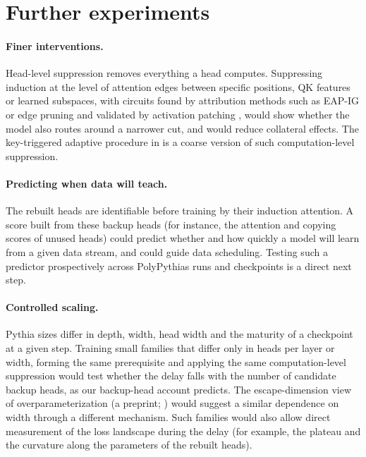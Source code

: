 \section{Further experiments}
\label{app:future}
\paragraph{Finer interventions.} Head-level suppression removes everything a head
computes. Suppressing induction at the level of attention edges between specific
positions, QK features \citep{kamath2025tracing} or learned subspaces, with
circuits found by attribution methods such as EAP-IG or edge pruning
\citep{hanna2024faith,bhaskar2024edge} and validated by activation patching
\citep{zhang2024patching}, would show whether the model also routes around a
narrower cut, and would reduce collateral effects. The key-triggered adaptive
procedure in  is a coarse version of such computation-level
suppression.

\paragraph{Predicting when data will teach.} The rebuilt heads are identifiable
before training by their induction attention. A score built from these backup
heads (for instance, the attention and copying scores of unused heads)
could predict whether and how quickly a model will learn from a given data stream,
and could guide data scheduling. Testing such a predictor prospectively across
PolyPythias runs and checkpoints is a direct next step.

\paragraph{Controlled scaling.} Pythia sizes differ in depth, width, head width and
the maturity of a checkpoint at a given step. Training small families that differ
only in heads per layer or width, forming the same prerequisite and applying the
same computation-level suppression would test whether the delay falls with the
number of candidate backup heads, as our backup-head account predicts. The
escape-dimension view of overparameterization (a preprint;
\citealp{martinelli2026escape}) would suggest a similar dependence on width through
a different mechanism. Such families would also allow direct measurement of the
loss landscape during the delay (for example, the plateau and the curvature along
the parameters of the rebuilt heads).

